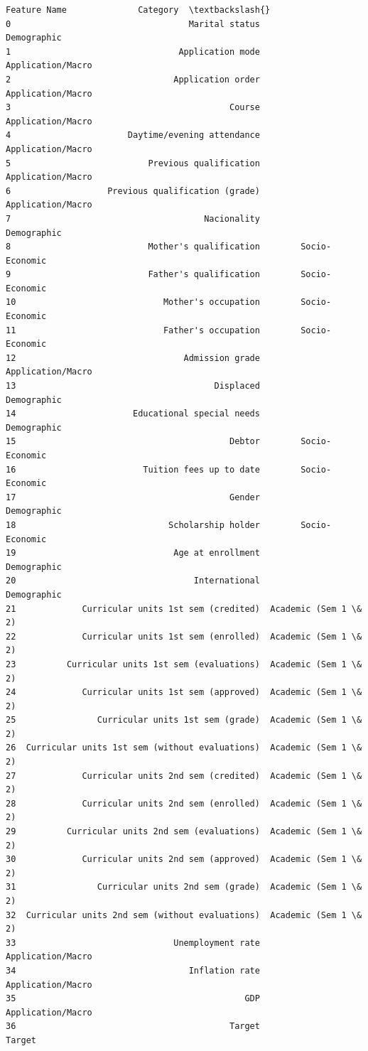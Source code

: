 \documentclass[11pt]{article}
\begin{document}
    
    \begin{Verbatim}[commandchars=\\\{\}]
                                      Feature Name              Category  \textbackslash{}
0                                   Marital status           Demographic   
1                                 Application mode     Application/Macro   
2                                Application order     Application/Macro   
3                                           Course     Application/Macro   
4                       Daytime/evening attendance     Application/Macro   
5                           Previous qualification     Application/Macro   
6                   Previous qualification (grade)     Application/Macro   
7                                      Nacionality           Demographic   
8                           Mother's qualification        Socio-Economic   
9                           Father's qualification        Socio-Economic   
10                             Mother's occupation        Socio-Economic   
11                             Father's occupation        Socio-Economic   
12                                 Admission grade     Application/Macro   
13                                       Displaced           Demographic   
14                       Educational special needs           Demographic   
15                                          Debtor        Socio-Economic   
16                         Tuition fees up to date        Socio-Economic   
17                                          Gender           Demographic   
18                              Scholarship holder        Socio-Economic   
19                               Age at enrollment           Demographic   
20                                   International           Demographic   
21             Curricular units 1st sem (credited)  Academic (Sem 1 \& 2)   
22             Curricular units 1st sem (enrolled)  Academic (Sem 1 \& 2)   
23          Curricular units 1st sem (evaluations)  Academic (Sem 1 \& 2)   
24             Curricular units 1st sem (approved)  Academic (Sem 1 \& 2)   
25                Curricular units 1st sem (grade)  Academic (Sem 1 \& 2)   
26  Curricular units 1st sem (without evaluations)  Academic (Sem 1 \& 2)   
27             Curricular units 2nd sem (credited)  Academic (Sem 1 \& 2)   
28             Curricular units 2nd sem (enrolled)  Academic (Sem 1 \& 2)   
29          Curricular units 2nd sem (evaluations)  Academic (Sem 1 \& 2)   
30             Curricular units 2nd sem (approved)  Academic (Sem 1 \& 2)   
31                Curricular units 2nd sem (grade)  Academic (Sem 1 \& 2)   
32  Curricular units 2nd sem (without evaluations)  Academic (Sem 1 \& 2)   
33                               Unemployment rate     Application/Macro   
34                                  Inflation rate     Application/Macro   
35                                             GDP     Application/Macro   
36                                          Target                Target   


\end{Verbatim}
\end{document}
